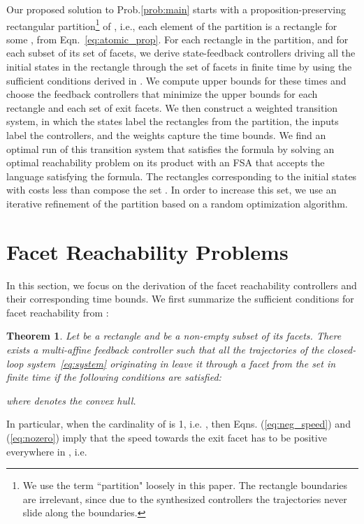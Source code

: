 \documentclass{ifacconf}
\newtheorem{theorem}{Theorem}
\begin{document}
Our proposed solution to Prob.\ref{prob:main} starts with a proposition-preserving rectangular partition\footnote{We use the term ``partition" loosely in this paper. 
The rectangle boundaries are irrelevant, since due to the synthesized controllers the trajectories never slide along the boundaries.} of , i.e., each element of the partition is a rectangle  for some ,  from Eqn.~\eqref{eq:atomic_prop}.
For each rectangle in the partition, and for each subset of its set of facets, we derive state-feedback controllers driving all the initial states in the rectangle through the set of facets in finite time by using the sufficient conditions derived in \cite{Habets2006}. We compute upper bounds for these times and choose the feedback controllers that minimize the upper bounds for each rectangle and each set of exit facets. We then construct a weighted transition system, in which the states label the rectangles from the partition, the inputs label the controllers, and the weights capture the time bounds. We find an optimal run of this transition system that satisfies the formula by solving an optimal reachability 
problem on its product with an FSA that accepts the language satisfying the formula.
The rectangles corresponding to the initial states with costs less than  compose the set . In order to increase this set, we use an iterative refinement of  the partition based on a random optimization algorithm.

\section{Facet Reachability Problems}
\label{sec:control}

In this section, we focus on the derivation of the facet reachability 
controllers and their corresponding time bounds. We first summarize the 
sufficient conditions for facet reachability from \cite{Habets2006}:

\begin{theorem}\label{thm:facet_reachability}
Let  be a rectangle and  be a non-empty subset of its facets. There exists a multi-affine feedback controller  such that all the trajectories of the closed-loop system~\eqref{eq:system} originating in  leave it through a facet from the set  in finite time if the following conditions are satisfied:

where  denotes the convex hull.
\end{theorem}

In particular, when the cardinality of  is 1, i.e. , 
then Eqns. (\ref{eq:neg_speed}) and (\ref{eq:nozero}) imply that the speed towards the exit facet  has to be positive everywhere in , i.e.
\end{document}
